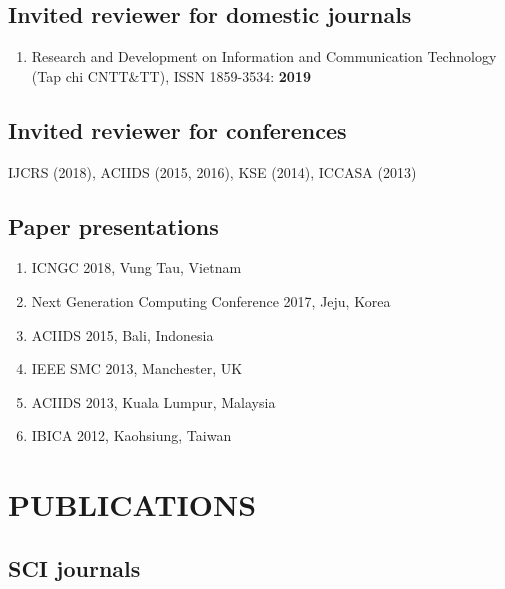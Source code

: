 \documentclass[letterpaper]{article}
\renewenvironment{itemize}{
  \begin{list}{}{
    \setlength{\leftmargin}{1.5em}
  }
}{
  \end{list}
}
\begin{document}
\subsection*{Invited reviewer for domestic journals}

\begin{enumerate}

\item Research and Development on Information and Communication Technology (Tap chi CNTT\&TT), ISSN 1859-3534: \textbf{2019}
\end{enumerate}

\subsection*{Invited reviewer for conferences}

\begin{itemize}

\item IJCRS (2018), ACIIDS (2015, 2016), KSE (2014), ICCASA (2013)
\end{itemize}

\subsection*{Paper presentations}

\begin{enumerate}

\item ICNGC 2018, Vung Tau, Vietnam
\item Next Generation Computing Conference 2017, Jeju, Korea
\item ACIIDS 2015, Bali, Indonesia 
\item IEEE SMC 2013, Manchester, UK
\item ACIIDS 2013, Kuala Lumpur, Malaysia
\item IBICA 2012, Kaohsiung, Taiwan
\end{enumerate}

\section*{PUBLICATIONS}

\subsection*{SCI journals}
\end{document}
